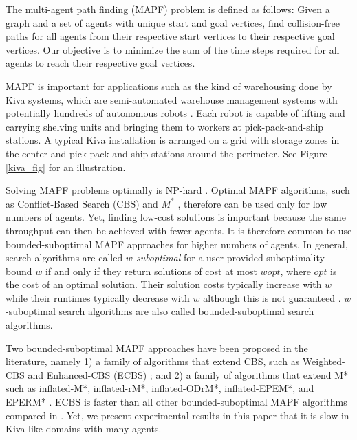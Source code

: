 \documentclass[letterpaper]{article}
\theoremstyle{definition}
\begin{document}
The multi-agent path finding (MAPF) problem is defined as follows: Given a
graph and a set of agents with unique start and goal vertices, find
collision-free paths for all agents from their respective start vertices to
their respective goal vertices. Our objective is to minimize the sum of the
time steps required for all agents to reach their respective goal vertices.

MAPF is important for applications such as the kind of warehousing done by
Kiva systems, which are semi-automated warehouse management systems with
potentially hundreds of autonomous robots \cite{WDM:AIM:08}. Each robot is
capable of lifting and carrying shelving units and bringing them to workers at
pick-pack-and-ship stations. A typical Kiva installation is arranged on a grid
with storage zones in the center and pick-pack-and-ship stations around the
perimeter. See Figure \ref{kiva_fig} for an illustration.

Solving MAPF problems optimally is NP-hard \cite{YL:AAAI:13}. Optimal MAPF
algorithms, such as Conflict-Based Search (CBS) \cite{SSFS:AIJ:15} and $M^*$
\cite{WC:AI:15}, therefore can be used only for low numbers of agents. Yet,
finding low-cost solutions is important because the same throughput can then
be achieved with fewer agents. It is therefore common to use
bounded-suboptimal MAPF approaches for higher numbers of agents. In general,
search algorithms are called \emph{$w$-suboptimal} for a user-provided
suboptimality bound $w$ if and only if they return solutions of cost at most
$w opt$, where $opt$ is the cost of an optimal solution. Their solution costs
typically increase with $w$ while their runtimes typically decrease with $w$
although this is not guaranteed \cite{WR:SOCS:12}. $w$-suboptimal search
algorithms are also called bounded-suboptimal search algorithms.

Two bounded-suboptimal MAPF approaches have been proposed in the literature,
namely 1) a family of algorithms that extend CBS, such as Weighted-CBS and
Enhanced-CBS (ECBS) \cite{BSSF:SOCS:14}; and 2) a family of algorithms that
extend M* such as inflated-M*, inflated-rM*, inflated-ODrM*, inflated-EPEM*,
and EPERM* \cite{WC:AI:15}. ECBS is faster than all other bounded-suboptimal
MAPF algorithms compared in \cite{BSSF:SOCS:14}.  Yet, we present experimental
results in this paper that it is slow in Kiva-like domains with many agents.
\end{document}
